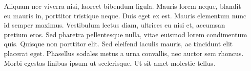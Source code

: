 Aliquam nec viverra nisi, laoreet bibendum ligula. Mauris lorem neque, blandit eu mauris in, porttitor tristique neque. Duis eget ex est. Mauris elementum nunc id semper maximus. Vestibulum lectus diam, ultrices eu nisi et, accumsan pretium eros. Sed pharetra pellentesque nulla, vitae euismod lorem condimentum quis. Quisque non porttitor elit. Sed eleifend iaculis mauris, ac tincidunt elit placerat eget. Phasellus sodales metus a urna convallis, nec auctor sem rhoncus. Morbi egestas finibus ipsum ut scelerisque. Ut sit amet molestie tellus.

